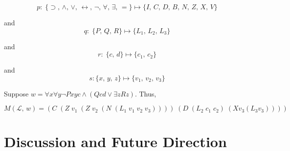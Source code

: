\documentclass[ms]{uncgdissertationexp2}
\theoremstyle{plain}
\theoremstyle{definition}
\theoremstyle{remark}
\begin{document}
\[
    p:\;\{\supset,\,\land,\,\lor,\,\leftrightarrow,\,\lnot,\,\forall,\,\exists,\,=\}\mapsto \{I,\,C,\,D,\,B,\,N,\,Z,\,X,\,V\}
\]

and
\[
    q:\;\{P,\,Q,\,R\} \mapsto \{L_{1},\,L_{2},\,L_{3}\}
\]

and
\[
    r:\;\{c,\,d\} \mapsto \{c_1,\,c_2\}
\]

and
\[
    s:\{x,\,y,\,z\} \mapsto \{v_1,\,v_2,\,v_3\}
\]

Suppose $w = \forall{x}\forall{y}\lnot{Pxyc} \land (Qcd \lor \exists{z}Rz)$. Thus,

\[
    M(\mathcal{L},\,w) = (C\;(Z\;v_1\;(Z\;v_2\;(N\;(L_1\;v_1\;v_2\;v_3))))\;(D\;(L_2\;c_1\;c_2)\;(X v_3 (L_3 v_3))))
\]

\chapter{Discussion and Future Direction}






\nocite{*}


\backmatter
\end{document}
